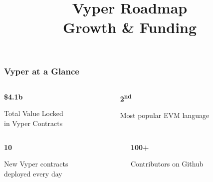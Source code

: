 \documentclass[aspectratio=169]{beamer}
\title{Vyper Roadmap \\ Growth \& Funding}
\begin{document}
	
	\begin{frame}[plain]
		\titlepage
	\end{frame}
	
	\begin{frame}
		\frametitle{Vyper at a Glance}
		\begin{columns}[T,totalwidth=\textwidth]
			\begin{column}{0.5\textwidth}
				\begin{center}
					\textcolor{vyperviolet}{\fontsize{40}{48}\selectfont\textbf{\$4.1b}}
					\vspace{0.5em}
					
					\small Total Value Locked\\in Vyper Contracts
				\end{center}
			\end{column}
			\begin{column}{0.5\textwidth}
				\begin{center}
					\textcolor{vyperviolet}{\fontsize{40}{48}\selectfont\textbf{2\textsuperscript{nd}}}
					\vspace{0.5em}
					
					\small Most popular EVM language
				\end{center}
			\end{column}
		\end{columns}
		
		\vspace{1em}
		
		\begin{columns}[T,totalwidth=\textwidth]
			\begin{column}{0.5\textwidth}
				\begin{center}
					\textcolor{vyperviolet}{\fontsize{40}{48}\selectfont\textbf{10}}
					\vspace{0.5em}
					
					\small New Vyper contracts\\deployed every day
				\end{center}
			\end{column}
			\begin{column}{0.5\textwidth}
				\begin{center}
					\textcolor{vyperviolet}{\fontsize{40}{48}\selectfont\textbf{100+}}
					\vspace{0.5em}
					
					\small Contributors on Github
				\end{center}
			\end{column}
		\end{columns}
	\end{frame}
	
\end{document}
